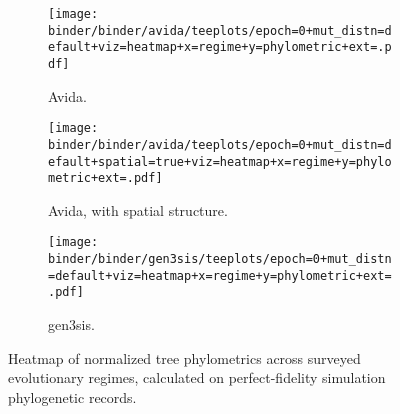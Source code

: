 \begin{figure*}
  \centering
  \begin{subfigure}[b]{\textwidth}
    \texttt{[image: binder/binder/avida/teeplots/epoch=0+mut\_distn=default+viz=heatmap+x=regime+y=phylometric+ext=.pdf]}
    \caption{Avida.}
    \label{fig:perfect-tree-phylometrics-heatmap-avida}
  \end{subfigure}
  \vspace{1cm} 
  \begin{subfigure}[b]{\textwidth}
    \texttt{[image: binder/binder/avida/teeplots/epoch=0+mut\_distn=default+spatial=true+viz=heatmap+x=regime+y=phylometric+ext=.pdf]}
    \caption{Avida, with spatial structure.}
    \label{fig:perfect-tree-phylometrics-heatmap-avida-spatial}
  \end{subfigure}
  \vspace{1cm} 
  \begin{subfigure}[b]{\textwidth}
    \texttt{[image: binder/binder/gen3sis/teeplots/epoch=0+mut\_distn=default+viz=heatmap+x=regime+y=phylometric+ext=.pdf]}
    \caption{gen3sis.}
    \label{fig:perfect-tree-phylometrics-heatmap-gen3sis}
  \end{subfigure}
  \caption{Heatmap of normalized tree phylometrics across surveyed evolutionary regimes, calculated on perfect-fidelity simulation phylogenetic records.}
  \label{fig:perfect-tree-phylometrics-heatmap-avida-gen3sis}
\end{figure*}